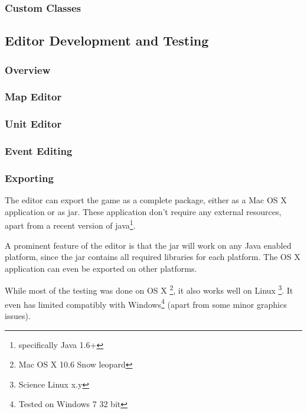 \subsubsection{Custom Classes} %
\label{ssub:custom_classes}


\subsection{Editor Development and Testing}

\subsubsection{Overview}
\label{ssub:overview}

\subsubsection{Map Editor}
\label{ssub:map_editor}

\subsubsection{Unit Editor}
\label{ssub:unit_editors}

\subsubsection{Event Editing}

\subsubsection{Exporting}
\label{ssub:exporting}

The editor can export the game as a complete package, either as a Mac OS X application or as jar. These application don't require any external resources, apart from a recent version of java\footnote{specifically Java 1.6+}.

A prominent feature of the editor is that the jar will work on any Java enabled platform, since the jar contains all required libraries for each platform. The OS X application can even be exported on other platforms.

While most of the testing was done on OS X \footnote{Mac OS X 10.6 Snow leopard}, it also works well on Linux \footnote{Science  Linux x.y}. It even has limited compatibly with Windows\footnote{Tested on Windows 7 32 bit} (apart from some minor graphics issues).
